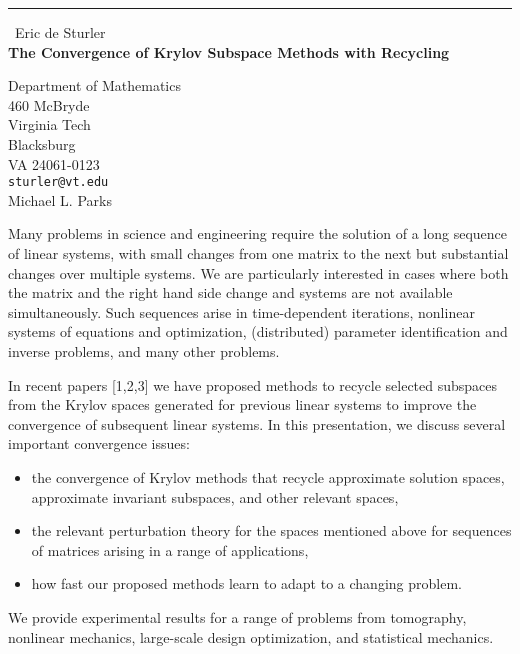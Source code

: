 \documentclass{report}
\begin{document}
\begin{center}
\rule{6in}{1pt} \
{\large Eric de Sturler \\
{\bf The Convergence of Krylov Subspace Methods with Recycling}}

Department of Mathematics \\ 460 McBryde \\ Virginia Tech \\ Blacksburg \\ VA 24061-0123
\\
{\tt sturler@vt.edu}\\
Michael L. Parks\end{center}

Many problems in science and engineering require the solution of a long
sequence of linear systems, with small changes from one matrix to the
next but substantial changes over multiple systems. We are particularly
interested in cases where both the matrix and the right hand side change
and systems are not available simultaneously. Such sequences arise in
time-dependent iterations, nonlinear systems of equations and
optimization, (distributed) parameter identification
and inverse problems, and many other problems.

In recent papers [1,2,3] we have
proposed methods to recycle selected subspaces from the Krylov
spaces generated for previous linear systems to improve the
convergence of subsequent linear systems. In this presentation, we
discuss several important convergence issues:
\begin{itemize}
\item the convergence of Krylov methods that recycle approximate
solution spaces, approximate invariant subspaces, and other relevant spaces,

\item the relevant perturbation theory for the spaces mentioned above for
sequences of matrices arising in a range of applications,

\item how fast our proposed methods learn to adapt to a changing
problem.
\end{itemize}
We provide experimental results for a range of problems from
tomography, nonlinear mechanics, large-scale design optimization, and
statistical mechanics.
\end{document}
